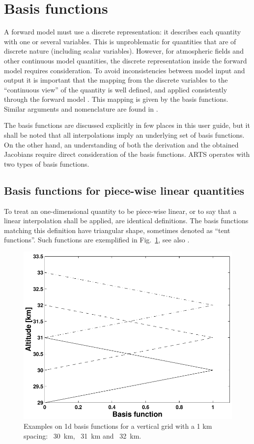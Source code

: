  
\section{Basis functions}
\label{sec:wfuns:basis}

A forward model must use a discrete representation: it describes each quantity
with one or several variables. This is unproblematic for quantities that are of
discrete nature (including scalar variables). However, for atmospheric fields
and other continuous model quantities, the discrete representation inside the
forward model requires consideration. To avoid inconsistencies between model
input and output it is important that the mapping from the discrete variables
to the ``continuous view'' of the quantity is well defined, and applied
consistently through the forward model . This mapping is given by the basis
functions. Similar arguments and nomenclature are found
in \citet{read:thecl:06}.

The basis functions are discussed explicitly in few places in this user guide,
but it shall be noted that all interpolations imply an underlying set of basis
functions. On the other hand, an understanding of both the derivation and the
obtained Jacobians require direct consideration of the basis functions. ARTS
operates with two types of basis functions.




\subsection{Basis functions for piece-wise linear quantities}
\label{sec:wfuns:basis1}
%
To treat an one-dimensional quantity to be piece-wise linear, or to say that a
linear interpolation shall be applied, are identical definitions. The basis
functions matching this definition have triangular shape, sometimes denoted as
``tent functions''. Such functions are exemplified in
Fig.~\ref{fig:wfuns:zbasis}, see also \citet{buehler:artst:05}.

\begin{figure}[t]
 \begin{center}
  \includegraphics*[width=0.7\hsize]{fig_absbasis_z}
  \caption{Examples on 1d basis functions for a vertical grid with a 1 km
           spacing: \lsolid~30~km, \ldashed~31~km and \ldashdot~32~km.}
  \label{fig:wfuns:zbasis}  
 \end{center}
\end{figure}

